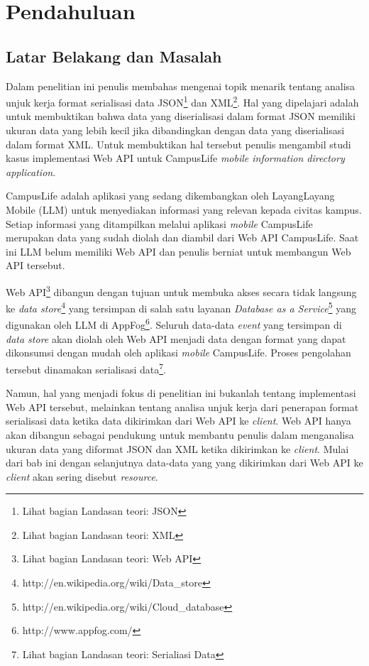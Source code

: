\documentclass{llncs}
\begin{document}
\section{Pendahuluan}

\subsection{Latar Belakang dan Masalah}
\onehalfspacing Dalam penelitian ini penulis membahas mengenai topik menarik tentang analisa unjuk kerja format serialisasi data JSON\footnote{Lihat bagian Landasan teori: JSON} dan XML\footnote{Lihat bagian Landasan teori: XML}. Hal yang dipelajari adalah untuk membuktikan bahwa data yang diserialisasi dalam format JSON memiliki ukuran data yang lebih kecil jika dibandingkan dengan data yang diserialisasi dalam format XML. Untuk membuktikan hal tersebut penulis mengambil studi kasus implementasi Web API untuk CampusLife \textit{mobile information directory application}.

\onehalfspacing CampusLife adalah aplikasi yang sedang dikembangkan oleh LayangLayang Mobile (LLM) untuk menyediakan informasi yang relevan kepada civitas kampus. Setiap informasi yang ditampilkan melalui aplikasi \textit{mobile} CampusLife merupakan data yang sudah diolah dan diambil dari Web API CampusLife. Saat ini LLM belum memiliki Web API dan penulis berniat untuk membangun Web API tersebut.

Web API\footnote{Lihat bagian Landasan teori: Web API} dibangun dengan tujuan untuk membuka akses secara tidak langsung ke \textit{data store}\footnote{http://en.wikipedia.org/wiki/Data\_store} yang tersimpan di salah satu layanan \textit{Database as a Service}\footnote{http://en.wikipedia.org/wiki/Cloud\_database} yang digunakan oleh LLM di AppFog\footnote{http://www.appfog.com/}. Seluruh data-data \textit{event} yang tersimpan di \textit{data store} akan diolah oleh Web API menjadi data dengan format yang dapat dikonsumsi dengan mudah oleh aplikasi \textit{mobile} CampusLife. Proses pengolahan tersebut dinamakan serialisasi data\footnote{Lihat bagian Landasan teori: Serialiasi Data}.

\newpage
\onehalfspacing Namun, hal yang menjadi fokus di penelitian ini bukanlah tentang implementasi Web API tersebut, melainkan tentang analisa unjuk kerja dari penerapan format serialisasi data ketika data dikirimkan dari Web API ke \textit{client}. Web API hanya akan dibangun sebagai pendukung untuk membantu penulis dalam menganalisa ukuran data yang diformat JSON dan XML ketika dikirimkan ke \textit{client}. Mulai dari bab ini dengan selanjutnya data-data yang yang dikirimkan dari Web API ke \textit{client} akan sering disebut \textit{resource}. 
\end{document}
